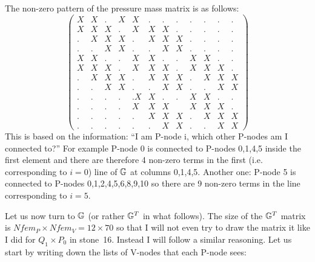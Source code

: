 The non-zero pattern of the pressure mass matrix is as follows:
\[
\left(
\begin{array}{cccccccccccc}
X&X&.&X&X&.&.&.&.&.&.&. \\
X&X&X&.&X&X&X&.&.&.&.&. \\
.&X&X&X&.&X&X&X&.&.&.&. \\
.&.&X&X&.&.&X&X&.&.&.&. \\
X&X&.&.&X&X&.&.&X&X&.&. \\
X&X&X&.&X&X&X&.&X&X&X&.\\
.&X&X&X&.&X&X&X&.&X&X&X\\
.&.&X&X&.&.&X&X&.&.&X&X \\
.&.&.&.&.X&X&.&.&X&X&.&. \\
.&.&.&.&X&X&X&&X&X&X&.\\
.&.&.&.&.&X&X&X&.&X&X&X\\
.&.&.&.&.&.&X&X&.&.&X&X
\end{array}
\right)
\]
This is based on the information: ``I am P-node i, which other P-nodes am I connected to?''
For example P-node 0 is connected to P-nodes 0,1,4,5 inside the first element and 
there are therefore 4 non-zero terms in the first (i.e. corresponding to $i=0$) line of ${\mathbb{G}}$
at columns 0,1,4,5.
Another one: P-node 5 is connected to P-nodes 0,1,2,4,5,6,8,9,10 so there are 9 non-zero terms in the 
line corresponding to $i=5$.

Let us now turn to ${\mathbb{G}}$ (or rather ${\mathbb{G}}^T$ in what follows).
The size of the ${\mathbb{G}}^T$ matrix is $Nfem_P \times Nfem_V=12 \times 70$
so that I will not even try to draw the matrix it like I did for $Q_1\times P_0$ 
in stone~16. Instead I will follow a similar reasoning.
Let us start by writing down the lists of V-nodes that each P-node sees:


